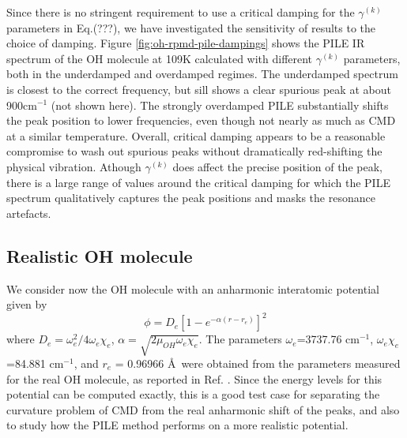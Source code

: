\documentclass[aps,prb,superscriptaddress,amsmath,amssymb,showpacs,twocolumn]{revtex4}
\begin{document}
Since there is no stringent requirement to use a critical damping for the 
$\gamma^{(k)}$ parameters in Eq.(???), we have investigated the sensitivity of 
results to the choice of damping. Figure \ref{fig:oh-rpmd-pile-dampings} 
shows the PILE IR spectrum of the OH molecule at 109K calculated with different
$\gamma^{(k)}$ parameters, both in the underdamped and overdamped regimes. 
The underdamped spectrum is closest to the correct frequency, 
but sill shows a clear spurious peak at about 900cm$^{-1}$ (not shown here). 
The strongly overdamped PILE substantially shifts the peak position to lower
frequencies, even though not nearly as much as CMD at a similar temperature. 
Overall, critical damping appears to be a reasonable compromise to wash out 
spurious peaks without dramatically red-shifting the physical vibration. 
Athough $\gamma^{(k)}$ does affect the precise position of the peak, there
is a large range of values around the critical damping for which the PILE
spectrum qualitatively captures the peak positions and masks the
resonance artefacts.

\subsection{Realistic OH molecule}


We consider now the OH molecule 
with an anharmonic interatomic potential given by
%
\begin{equation}
\phi = D_{e} \left[ 1-e^{-\alpha(r-r_{e})}\right]^2 
\label{eq:morse}
\end{equation}
%
 where $D_{e} = \omega_e^2/4\omega_e\chi_e$, $\alpha=\sqrt{2\mu_{OH}\omega_e\chi_e}$. The 
parameters $\omega_e$=3737.76 cm$^{-1}$, $\omega_e \chi_e$=84.881 cm$^{-1}$, and $r_{e}$ = 0.96966 \AA\, 
were obtained from the parameters measured for the real OH molecule, as reported in Ref. \cite{HerzbergBook}.
Since the energy levels for this potential can be computed exactly, this is a good test case for 
separating the curvature problem of CMD from the real anharmonic shift of the peaks, 
and also to study how the PILE method performs on a more realistic potential.
\end{document}
